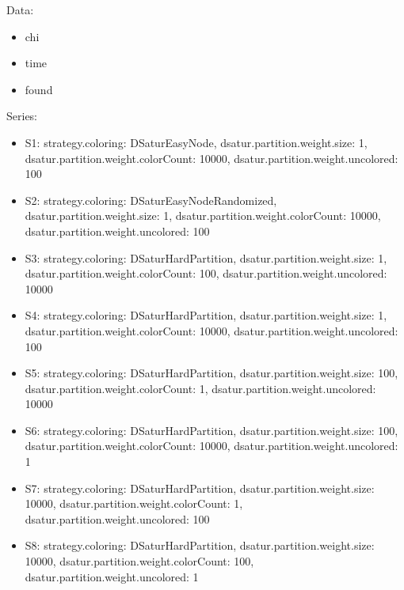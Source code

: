 \documentclass[landscape, 12pt]{report}
\begin{document}
	Data:
\begin{itemize}
\item chi
\item time
\item found
\end{itemize}
Series:
\begin{itemize}
\item S1: strategy.coloring: DSaturEasyNode, dsatur.partition.weight.size: 1, dsatur.partition.weight.colorCount: 10000, dsatur.partition.weight.uncolored: 100
\item S2: strategy.coloring: DSaturEasyNodeRandomized, dsatur.partition.weight.size: 1, dsatur.partition.weight.colorCount: 10000, dsatur.partition.weight.uncolored: 100
\item S3: strategy.coloring: DSaturHardPartition, dsatur.partition.weight.size: 1, dsatur.partition.weight.colorCount: 100, dsatur.partition.weight.uncolored: 10000
\item S4: strategy.coloring: DSaturHardPartition, dsatur.partition.weight.size: 1, dsatur.partition.weight.colorCount: 10000, dsatur.partition.weight.uncolored: 100
\item S5: strategy.coloring: DSaturHardPartition, dsatur.partition.weight.size: 100, dsatur.partition.weight.colorCount: 1, dsatur.partition.weight.uncolored: 10000
\item S6: strategy.coloring: DSaturHardPartition, dsatur.partition.weight.size: 100, dsatur.partition.weight.colorCount: 10000, dsatur.partition.weight.uncolored: 1
\item S7: strategy.coloring: DSaturHardPartition, dsatur.partition.weight.size: 10000, dsatur.partition.weight.colorCount: 1, dsatur.partition.weight.uncolored: 100
\item S8: strategy.coloring: DSaturHardPartition, dsatur.partition.weight.size: 10000, dsatur.partition.weight.colorCount: 100, dsatur.partition.weight.uncolored: 1
\end{itemize}
\end{document}
